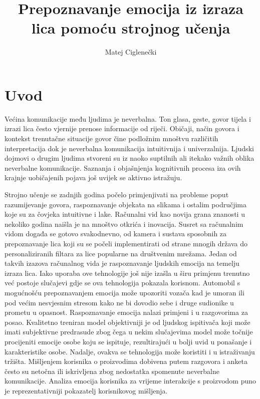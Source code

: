 \documentclass[times, utf8, zavrsni,numeric,pstricks]{fer}
\begin{document}

\title{Prepoznavanje emocija iz izraza lica pomoću strojnog učenja}

\author{Matej Ciglenečki}

\maketitle

\izvornik

\zahvala{}

\tableofcontents

\chapter{Uvod}

Većina komunikacije među ljudima je neverbalna. Ton glasa, geste, govor tijela i izrazi lica često vjernije prenose informacije od riječi. Običaji, način govora i kontekst trenutačne situacije govor čine podložnim mnoštvu različitih interpretacija dok je neverbalna komunikacija intuitivnija i univerzalnija. Ljudski dojmovi o drugim ljudima stvoreni su iz naoko suptilnih ali itekako važnih oblika neverbalne komunikacije. Saznanja i objašnjenja kognitivnih procesa iza ovih krajnje uobičajenih pojava još uvijek se aktivno istražuju. 

Strojno učenje se zadnjih godina počelo primjenjivati na probleme poput razumijevanje govora, raspoznavanje objekata na slikama i ostalim područjima koje su za čovjeka intuitivne i lake. Računalni vid kao novija grana znanosti u nekoliko godina naišla je na mnoštvo otkrića i inovacija. Susret sa računalnim vidom događa se gotovo svakodnevno, od kamera i sustava sposobnih za prepoznavanje lica koji su se počeli implementirati od strane mnogih država do personaliziranih filtara za lice popularne na društvenim mrežama. Jedan od takvih izazova računalnog vida je raspoznavanje ljudskih emocija na temelju izraza lica. Iako uporaba ove tehnologije još nije izašla u širu primjenu trenutno već postoje slučajevi gdje se ova tehnologija pokazala korisnom. Automobil s mogućnošću prepoznavanjem emocija može upozoriti vozača kad je umoran ili pod većim nesvjesnim stresom kako ne bi dovodio sebe i druge sudionike u prometu u opasnost. Raspoznavanje emocija nalazi primjeni i u razgovorima za posao. Kvalitetno treniran model objektivniji je od ljudskog ispitivača koji može imati subjektivne predrasude zbog čega u nekim slučajevima model može točnije procijeniti emocije osobe koju se ispituje, rezultirajući u bolji uvid u ponašanje i karakteristike osobe. Nadalje, ovakva se tehnologija može koristiti i u istraživanju tržišta. Mišljenjem korisnika o proizvodima dobivena putem razgovora i anketa često su netočna ili iskrivljena zbog nedostatka spomenute neverbalne komunikacije. Analiza emocija korisnika za vrijeme interakcije s proizvodom puno je reprezentativniji pokazatelj korisnikovog mišljenja. 
\end{document}
